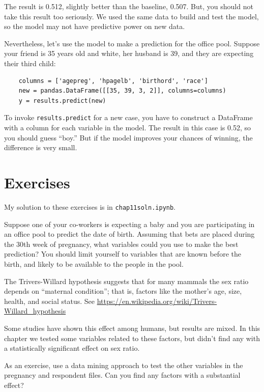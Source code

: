 \documentclass[12pt]{book}
\begin{document}
The result is 0.512, slightly better than the
baseline, 0.507.  But, you should not take this result too seriously.
We used the same data to build and test the model, so the model
may not have predictive power on new data.

Nevertheless, let's use the model to make a prediction for the office
pool.  Suppose your friend is 35 years old and white,
her husband is 39, and they are expecting their third child:

\begin{verbatim}
    columns = ['agepreg', 'hpagelb', 'birthord', 'race']
    new = pandas.DataFrame([[35, 39, 3, 2]], columns=columns)
    y = results.predict(new)
\end{verbatim}

To invoke \verb"results.predict" for a new case, you have to construct
a DataFrame with a column for each variable in the model.  The result
in this case is 0.52, so you should guess ``boy.''  But if the model
improves your chances of winning, the difference is very small.



\section{Exercises}

My solution to these exercises is in \verb"chap11soln.ipynb".

\begin{exercise}
Suppose one of your co-workers is expecting a baby and you are
participating in an office pool to predict the date of birth.
Assuming that bets are placed during the 30th week of pregnancy, what
variables could you use to make the best prediction?  You should limit
yourself to variables that are known before the birth, and likely to
be available to the people in the pool.

\end{exercise}


\begin{exercise}
The Trivers-Willard hypothesis suggests that for many mammals the
sex ratio depends on ``maternal condition''; that is,
factors like the mother's age, size, health, and social status.
See \url{https://en.wikipedia.org/wiki/Trivers-Willard_hypothesis}

Some studies have shown this effect among humans, but results are
mixed.  In this chapter we tested some variables related to these
factors, but didn't find any with a statistically significant effect
on sex ratio.
   

As an exercise, use a data mining approach to test the other variables
in the pregnancy and respondent files.  Can you find any factors with
a substantial effect?  

\end{exercise}
\end{document}
